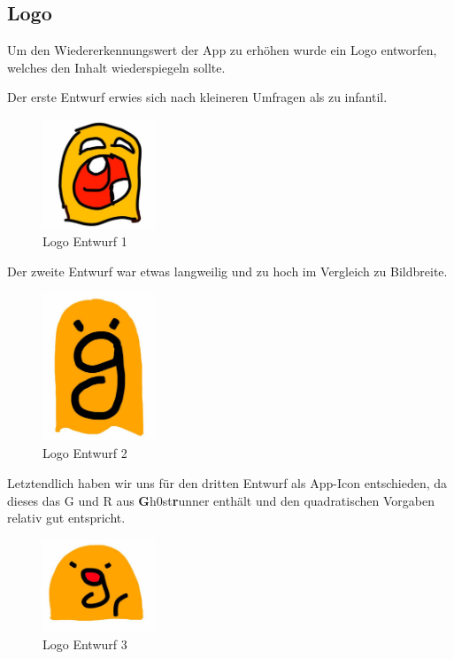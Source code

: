 \subsection{Logo}
Um den Wiedererkennungswert der App zu erhöhen wurde ein Logo entworfen, welches den Inhalt wiederspiegeln sollte.

Der erste Entwurf erwies sich nach kleineren Umfragen als zu infantil.

\begin{figure}[!h]
\centering
\includegraphics[width=0.3\textwidth]{abb/icon_entwurf1}
\caption{Logo Entwurf 1}
\end{figure}
Der zweite Entwurf war etwas langweilig und zu hoch im Vergleich zu Bildbreite. 

\begin{figure}[!h]
\centering
\includegraphics[width=0.3\textwidth]{abb/icon_entwurf2}
\caption{Logo Entwurf 2}
\end{figure}
Letztendlich haben wir uns für den dritten Entwurf als App-Icon entschieden, da dieses das G und R aus \textbf{G}h0st\textbf{r}unner enthält und den quadratischen Vorgaben relativ gut entspricht.
\begin{figure}[!h]
\centering
\includegraphics[width=0.3\textwidth]{abb/icon_entwurf3}
\caption{Logo Entwurf 3}
\end{figure}

